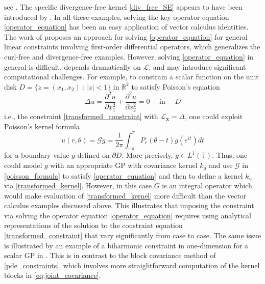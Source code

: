 see . 
The specific divergence-free kernel \eqref{div_free_SE} appears to have been introduced by .
In all these examples, solving the key operator equation \eqref{operator_equation} has been an easy application of vector calculus identities. The work of  proposes an approach for solving \eqref{operator_equation} for general linear constraints involving first-order differential operators, which generalizes the curl-free and divergence-free examples. However, solving \eqref{operator_equation} in general is difficult, depends dramatically on $\mathcal{L}$, and may introduce significant computational challenges.
For example, to constrain a scalar function on the unit disk $D = \{ z = (x_1,x_2) \ : \ |z| < 1 \}$ in $\mathbb{R}^2$
to satisfy Poisson's equation
\begin{equation}
\Delta u = \frac{\partial^2 u}{\partial x_1^2} + \frac{\partial^2 u}{\partial x_2^2} = 0 \quad \text{ in } \quad D
\end{equation}
i.e., the constraint \eqref{transformed_constraint} with $\mathcal{L}_{\mathbf{x}} = \Delta$, one could exploit Poisson's kernel formula
\begin{equation}\label{poisson_formula}
u(r,\theta) = \mathcal{G} g = \frac{1}{2\pi} \int_{-\pi}^{\pi} P_r(\theta - t) g(e^{it}) dt 
\end{equation}
for a boundary value $g$ defined on $\partial D$. More precisely, $g \in L^1(\mathbb{T})$. Thus, one could model $g$ with an appropriate GP with covariance kernel $k_g$ and use $\mathcal{G}$ in \eqref{poisson_formula} to satisfy \eqref{operator_equation} and then to define a kernel $k_u$ via \eqref{transformed_kernel}. However, in this case $G$ is an integral operator which would make evaluation of \eqref{transformed_kernel} more difficult than the vector calculus examples discussed above. This illustrates that imposing the constraint via solving the operator equation \eqref{operator_equation} requires using analytical representations of the solution to the constraint equation \eqref{transformed_constraint} that vary significantly from case to case. The same issue is illustrated by an example of a biharmonic constraint in one-dimension for a scalar GP in . This is in contrast to the block covariance method of \ref{pde_constraints}, which involves more straightforward computation of the kernel blocks in \eqref{eq:joint_covariance}.


